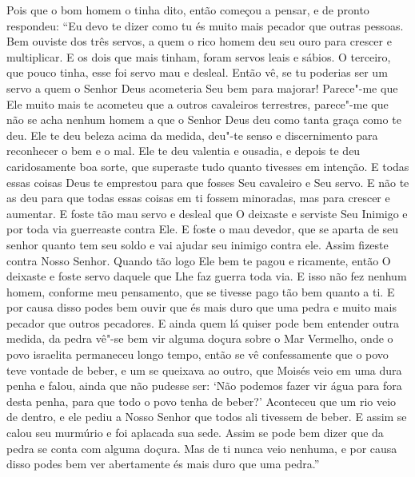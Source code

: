 Pois que o bom homem o tinha dito, então começou a pensar, e de pronto
respondeu: “Eu devo te dizer como tu és muito mais pecador que outras pessoas.
Bem ouviste dos três servos, a quem o rico homem deu seu ouro para crescer e
multiplicar. E os dois que mais tinham, foram servos leais e sábios. O
terceiro, que pouco tinha, esse foi servo mau e desleal. Então vê, se tu
poderias ser um servo a quem o Senhor Deus acometeria Seu bem para majorar!
Parece"-me que Ele muito mais te acometeu que a outros cavaleiros terrestres,
parece"-me que não se acha nenhum homem a que o Senhor Deus deu como tanta graça
como te deu. Ele te deu beleza acima da medida, deu"-te senso e discernimento
para reconhecer o bem e o mal. Ele te deu valentia e ousadia, e depois te deu
caridosamente boa sorte, que superaste tudo quanto tivesses em intenção. 
E todas essas coisas Deus te emprestou para que fosses Seu
cavaleiro e Seu servo. E não te as deu para que todas essas coisas em ti fossem
minoradas, mas para crescer e aumentar. E foste tão mau servo e desleal que O
deixaste e serviste Seu Inimigo e por toda via guerreaste contra Ele. E foste o
mau devedor, que se aparta de seu senhor quanto tem seu soldo e vai ajudar seu
inimigo contra ele. Assim fizeste contra Nosso Senhor. Quando tão logo Ele bem
te pagou e ricamente, então O deixaste e foste servo daquele que Lhe faz guerra
toda via. E isso não fez nenhum homem, conforme meu pensamento, que se tivesse
pago tão bem quanto a ti. E por causa disso podes bem ouvir que és mais duro
que uma pedra e muito mais pecador que outros pecadores. E ainda quem lá quiser
pode bem entender outra medida, da pedra vê"-se bem vir alguma doçura sobre o
Mar Vermelho, onde o povo israelita permaneceu longo tempo, então se vê
confessamente que o povo teve vontade de beber, e um se queixava ao outro, que
Moisés veio em uma dura penha e falou, ainda que não pudesse ser: ‘Não podemos
fazer vir água para fora desta penha, para que todo o povo tenha de beber?’
Aconteceu que um rio veio de dentro, e ele pediu a Nosso Senhor que todos ali
tivessem de beber. E assim se calou seu murmúrio e foi aplacada sua sede. Assim
se pode bem dizer que da pedra se conta com alguma doçura. Mas de ti nunca veio
nenhuma, e por causa disso podes bem ver abertamente és mais duro que uma
pedra.” 

